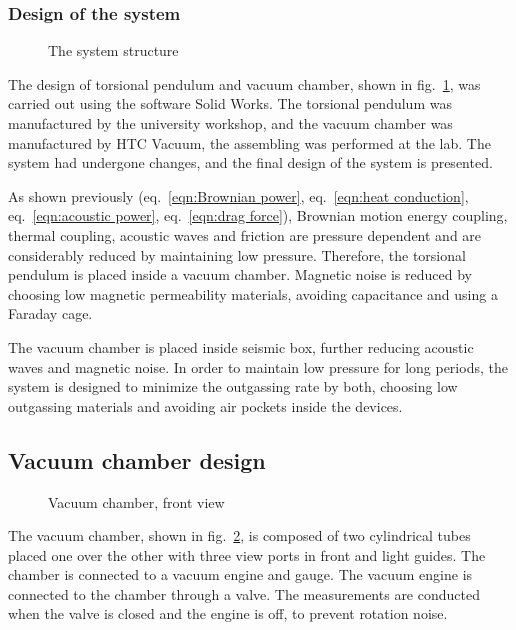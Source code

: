 \documentclass[\main/master.tex]{subfiles}
\begin{document}
\subsubsection{Design of the system}
\begin{figure}[htbp]
	\centering
	\caption[Total chamber]{The system structure}
	\label{fig:Total chamber}
\end{figure}
\FloatBarrier
\par\noindent
The design of torsional pendulum and vacuum chamber, shown in fig.~\ref{fig:Total chamber}, was carried out using the software Solid Works. The torsional pendulum was manufactured by the university workshop, and the vacuum chamber was manufactured by HTC Vacuum, the assembling was performed at the lab. The system had undergone changes, and the final design of the system is presented. 
\par\noindent
As shown previously (eq.~\ref{eqn:Brownian power}, eq.~\ref{eqn:heat conduction}, eq.~\ref{eqn:acoustic power}, eq.~\ref{eqn:drag force}), Brownian motion energy coupling, thermal coupling, acoustic waves and friction are pressure dependent and are considerably reduced by maintaining low pressure. Therefore, the torsional pendulum is placed inside a vacuum chamber. Magnetic noise is reduced by choosing low magnetic permeability materials, avoiding capacitance and using a Faraday cage. 
\par\noindent
The vacuum chamber is placed inside seismic box, further reducing acoustic waves and magnetic noise. In order to maintain low pressure for long periods, the system is designed to minimize the outgassing rate by both, choosing low outgassing materials and avoiding air pockets inside the devices. 
\subsection{Vacuum chamber design}
\begin{figure}[htbp]
	\centering
	\caption[Vacuum chamber, front view]{Vacuum chamber, front view}
	\label{fig:chamber front}
\end{figure}
\FloatBarrier

\par\noindent
The vacuum chamber, shown in fig.~\ref{fig:chamber front}, is composed of two cylindrical tubes placed one over the other with three view ports in front and light guides. The chamber is connected to a vacuum engine and gauge. The vacuum engine is connected to the chamber through a valve. The measurements are conducted when the valve is closed and the engine is off, to prevent rotation noise.
\end{document}
